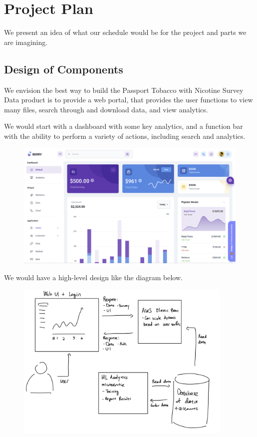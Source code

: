 \section{Project Plan}

We present an idea of what our schedule would be for the project and parts we are imagining.

\subsection{Design of Components}

We envision the best way to build the Passport Tobacco with Nicotine Survey
Data product is to provide a web portal, that provides the user functions to
view many files, search through and download data, and view analytics. 

We would start with a dashboard with some key analytics, and a function bar
with the ability to perform a variety of actions, including search and
analytics.

\begin{figure}[H]
  \centering
  \includegraphics[width=\textwidth]{dashboard.png}
\end{figure}

We would have a high-level design like the diagram below.

\begin{figure}[H]
  \centering
  \includegraphics[height=3in]{design.png}
\end{figure}

